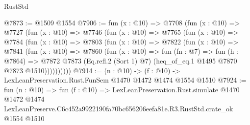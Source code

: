 \begin{lexlean}{RustStd}
\begin{coremodule}
@7873 := @1509 @1554
@7906 := fun (x : @10) =>
  @7708
    (fun (x : @10) =>
    @7727
      (fun (x : @10) =>
      @7746
        (fun (x : @10) =>
        @7765
          (fun (x : @10) =>
          @7784
            (fun (x : @10) =>
            @7803
              (fun (x : @10) =>
              @7822
                (fun (x : @10) =>
                @7841
                  (fun (x : @10) =>
                  @7860
                    (fun (x : @10) =>
                    fun (fn : @7) =>
                    fun (h : @7864) =>
                    @7872
                      @7873
                      (Eq.refl.{2} (Sort 1) @7)
                      (heq_of_eq.{1} @1495 @7870 @7873 @1510))))))))))
@7914 := (n : @10) -> (f : @10) -> LexLeanPreservation.Rust.FunSem @1470 @1472 @1474 @1554 @1510
@7924 := fun (n : @10) =>
  fun (f : @10) =>
  LexLeanPreservation.Rust.simulate
    @1470
    @1472
    @1474
    LexLeanPreserve.C6c452a9922190fa70bc656206eefa81e.R3.RustStd.crate_ok
    @1554
    @1510
\end{coremodule}
\end{lexlean}

